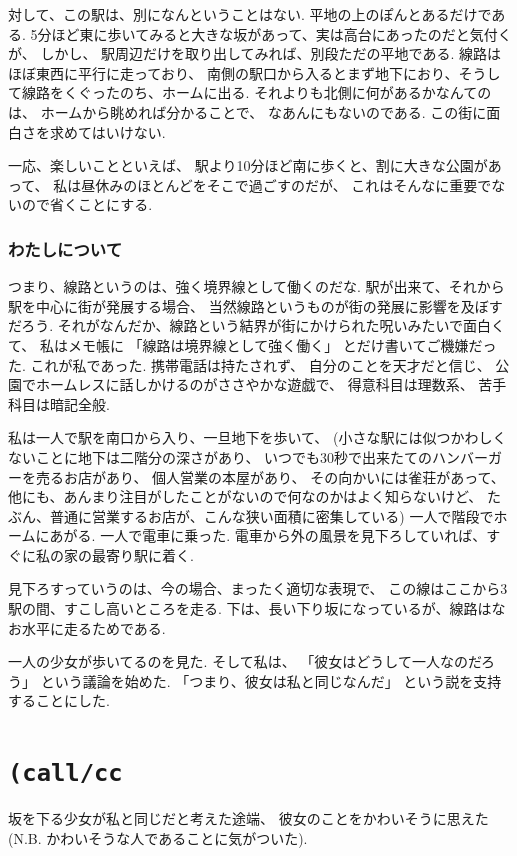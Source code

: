 対して、この駅は、別になんということはない.
平地の上のぽんとあるだけである.
5分ほど東に歩いてみると大きな坂があって、実は高台にあったのだと気付くが、
しかし、
駅周辺だけを取り出してみれば、別段ただの平地である.
線路はほぼ東西に平行に走っており、
南側の駅口から入るとまず地下におり、そうして線路をくぐったのち、ホームに出る.
それよりも北側に何があるかなんてのは、
ホームから眺めれば分かることで、
なあんにもないのである.
この街に面白さを求めてはいけない.

一応、楽しいことといえば、
駅より10分ほど南に歩くと、割に大きな公園があって、
私は昼休みのほとんどをそこで過ごすのだが、
これはそんなに重要でないので省くことにする.

\subsubsection*{わたしについて}

つまり、線路というのは、強く境界線として働くのだな.
駅が出来て、それから駅を中心に街が発展する場合、
当然線路というものが街の発展に影響を及ぼすだろう.
それがなんだか、線路という結界が街にかけられた呪いみたいで面白くて、
私はメモ帳に
「線路は境界線として強く働く」
とだけ書いてご機嫌だった.
これが私であった.
携帯電話は持たされず、
自分のことを天才だと信じ、
公園でホームレスに話しかけるのがささやかな遊戯で、
得意科目は理数系、
苦手科目は暗記全般.

\hline

私は一人で駅を南口から入り、一旦地下を歩いて、
(小さな駅には似つかわしくないことに地下は二階分の深さがあり、
いつでも30秒で出来たてのハンバーガーを売るお店があり、
個人営業の本屋があり、
その向かいには雀荘があって、
他にも、あんまり注目がしたことがないので何なのかはよく知らないけど、
たぶん、普通に営業するお店が、こんな狭い面積に密集している)
一人で階段でホームにあがる.
一人で電車に乗った.
電車から外の風景を見下ろしていれば、すぐに私の家の最寄り駅に着く.

見下ろすっていうのは、今の場合、まったく適切な表現で、
この線はここから3駅の間、すこし高いところを走る.
下は、長い下り坂になっているが、線路はなお水平に走るためである.

一人の少女が歩いてるのを見た. そして私は、
「彼女はどうして一人なのだろう」 という議論を始めた.
「つまり、彼女は私と同じなんだ」 という説を支持することにした.

\section*{\texttt{(call/cc}}
坂を下る少女が私と同じだと考えた途端、 彼女のことをかわいそうに思えた
(N.B. かわいそうな人であることに気がついた).

